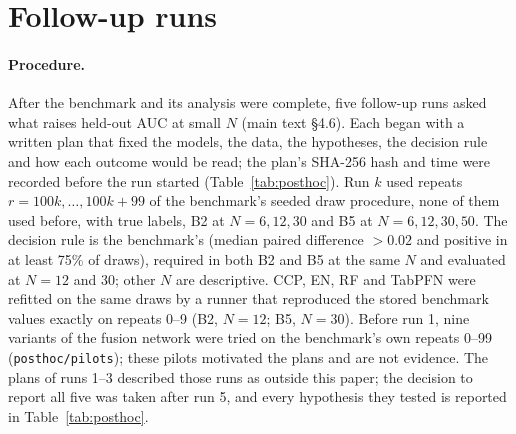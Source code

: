 \documentclass[10pt,letterpaper]{article}
\begin{document}
\section{Follow-up runs}\label{sup:posthoc}
\paragraph{Procedure.} After the benchmark and its analysis were complete, five follow-up runs asked what
raises held-out AUC at small $N$ (main text \S4.6). Each began with a written plan that fixed the models, the
data, the hypotheses, the decision rule and how each outcome would be read; the plan's SHA-256 hash and time
were recorded before the run started (Table~\ref{tab:posthoc}). Run $k$ used repeats $r = 100k, \dots,
100k + 99$ of the benchmark's seeded draw procedure, none of them used before, with true labels, B2 at
$N = 6, 12, 30$ and B5 at $N = 6, 12, 30, 50$. The decision rule is the benchmark's (median paired difference
$> 0.02$ and positive in at least 75\% of draws), required in both B2 and B5 at the same $N$ and evaluated at
$N = 12$ and 30; other $N$ are descriptive. CCP, EN, RF and TabPFN were refitted on the same draws by a runner
that reproduced the stored benchmark values exactly on repeats 0--9 (B2, $N = 12$; B5, $N = 30$). Before
run 1, nine variants of the fusion network were tried on the benchmark's own repeats 0--99
(\texttt{posthoc/pilots}); these pilots motivated the plans and are not evidence. The plans of runs 1--3
described those runs as outside this paper; the decision to report all five was taken after run 5, and every
hypothesis they tested is reported in Table~\ref{tab:posthoc}.
\end{document}
